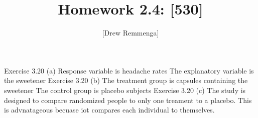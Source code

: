 \documentclass[10pt, oneside]{article}
\title{Homework 2.4: [530]}
\author{[Drew Remmenga]}
\begin{document}
\maketitle
\pagebreak
Exercise 3.20 (a)
Response variable is headache rates
The explanatory variable is the sweetener
\clearpage
Exercise 3.20 (b)
The treatment group is capsules containing the sweetener
The control group is placebo subjects
\clearpage
Exercise 3.20 (c)
The study is designed to compare randomized people to only one treament to a placebo. This is advnatageous becuase iot compares each individual to themselves.  
\end{document}
